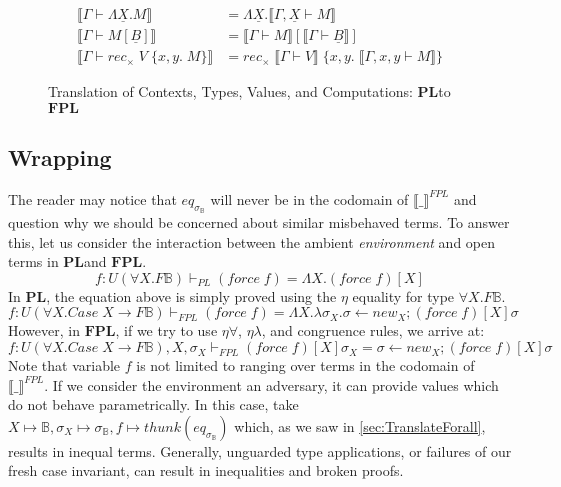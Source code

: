 \documentclass[acmsmall]{acmart}
\newcommand{\den}[1]{\llbracket #1\rrbracket}
\newcommand{\eric}[1]{\textcolor{red}{ <eric-#1> }}
\newcommand{\pl}{$\mathbf{PL}$}
\newcommand{\fpl}{$\mathbf{FPL}$}
\begin{document}
\begin{figure}[H]
\begin{minipage}[t]{0.48\textwidth}
\[\begin{aligned}
      \den{\Gamma \vdash \Lambda \underline{X}.M} &= \Lambda \underline{X}. \den{\Gamma , \underline{X} \vdash M} \\
      \den{\Gamma \vdash M[\underline{B}]} &= \den{\Gamma \vdash M}[\den{\Gamma \vdash \underline{B}}] \\
      \den{\Gamma \vdash rec_\times \;V \;\{x,y.\;M\}} &= rec_\times \;\den{\Gamma \vdash V}\;\{x,y.\; \den{\Gamma, x,y \vdash M}\}
    \end{aligned}
    \]
  \end{minipage}
  \caption{Translation of Contexts, Types, Values, and Computations: \pl to \fpl}
  \label{fig:TranslationPLFPL}
\end{figure}



\subsection{Wrapping}\label{sec:Wrap}
The reader may notice that $eq_{\sigma_{\mathbb{B}}}$ will never be in the codomain of $\den{\_}^{FPL}$ and question why we should be concerned about similar misbehaved terms. To answer this, let us consider the interaction between the ambient \textit{environment} and open terms in \pl\;and \fpl.
\[
  f : U(\forall X.F \mathbb{B}) \vdash_{PL} (force\;f) = \Lambda X. (force\;f)[X]
\]
In \pl, the equation above is simply proved using the $\eta$ equality for type $\forall X. F \mathbb{B}$. 
\[
  f : U(\forall X.Case\;X \to F \mathbb{B}) \vdash_{FPL} (force\;f) = \Lambda X. \lambda \sigma_X. \sigma \leftarrow new_X;(force\;f)[X]\sigma
\]
However, in \fpl, if we try to use $\eta\forall$, $\eta\lambda$, and congruence rules, we arrive at: 
\[
  f : U(\forall X.Case\;X \to F \mathbb{B}),X,\sigma_X \vdash_{FPL} (force\;f)[X]\sigma_X = \sigma \leftarrow new_X;(force\;f)[X]\sigma
\]
Note that variable $f$ is not limited to ranging over terms in the codomain of $\den{\_}^{FPL}$. If we consider the environment an adversary, it can provide values which do not behave parametrically. In this case, take $X\mapsto \mathbb{B}, \sigma_X \mapsto \sigma_\mathbb{B}, f \mapsto thunk(eq_{\sigma_{\mathbb{B}}})$ which, as we saw in \cref{sec:TranslateForall}, results in inequal terms.
Generally, unguarded type applications, or failures of our fresh case invariant, can result in inequalities and broken proofs.
\end{document}
